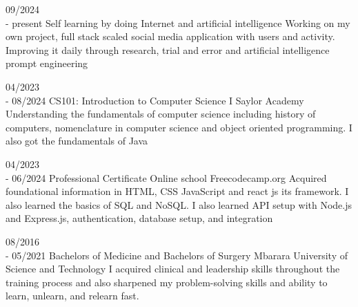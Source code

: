 \documentclass[9pt]{developercv} %
\begin{document}
\vspace{-10 pt}
\begin{entrylist}
    \entry
		{09/2024 \\- present}
		{Self learning by doing}
		{Internet and artificial intelligence}
		{Working on my own project, full stack scaled social media application with users and activity. Improving it daily through research, trial and error and artificial intelligence prompt engineering}
        
    \entry
		{04/2023 \\- 08/2024}
		{CS101: Introduction to Computer Science I}
		{Saylor Academy}
		{Understanding the fundamentals of computer science including history of computers, nomenclature in computer science and object oriented programming. I also got the fundamentals of Java }
        
    \entry
		{04/2023 \\- 06/2024}
		{Professional Certificate}
		{Online school Freecodecamp.org}
		{Acquired foundational information in HTML, CSS JavaScript and react js its framework. I also learned the basics of SQL and NoSQL. I also learned API setup with Node.js and Express.js, authentication, database setup, and integration}
        
	\entry
		{08/2016 \\- 05/2021}
		{Bachelors of Medicine and Bachelors of Surgery}
		{Mbarara University of Science and Technology}
		{I acquired clinical and leadership skills throughout the training process and also sharpened my problem-solving skills and ability to learn, unlearn, and relearn fast.}
\end{entrylist}
\end{document}
